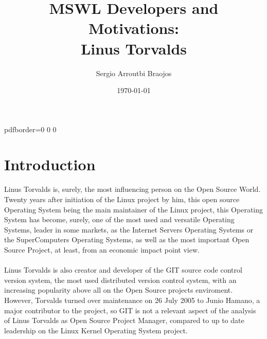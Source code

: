 \documentclass[11pt]{article}
\title{\textbf{MSWL Developers and Motivations:\\
Linus Torvalds}}
\author{Sergio Arroutbi Braojos}
\date{\today}
\begin{document}
\hypersetup
{   
pdfborder={0 0 0}
}
   
\maketitle

\pagebreak

\tableofcontents
\listoffigures
\listoftables

\pagebreak

\section{Introduction}
Linus Torvalds is, surely, the most influencing person on the Open Source World. Twenty years after initiation of the Linux project by him, this open source Operating System being the main maintainer of the Linux project, this Operating System has become, surely, one of the most used and versatile Operating Systems, leader in some markets, as the Internet Servers Operating Systems or the SuperComputers Operating Systems, as well as the most important Open Source Project, at least, from an economic impact point view.\\
\\
Linus Torvalds is also creator and developer of the GIT source code control version system, the most used distributed version control system, with an increasing popularity above all on the Open Source projects enviroment. However, Torvalds turned over maintenance on 26 July 2005 to Junio Hamano, a major contributor to the project, so GIT is not a relevant aspect of the analysis of Linus Torvalds as Open Source Project Manager, compared to up to date leadership on the Linux Kernel Operating System project.

\pagebreak
\end{document}

